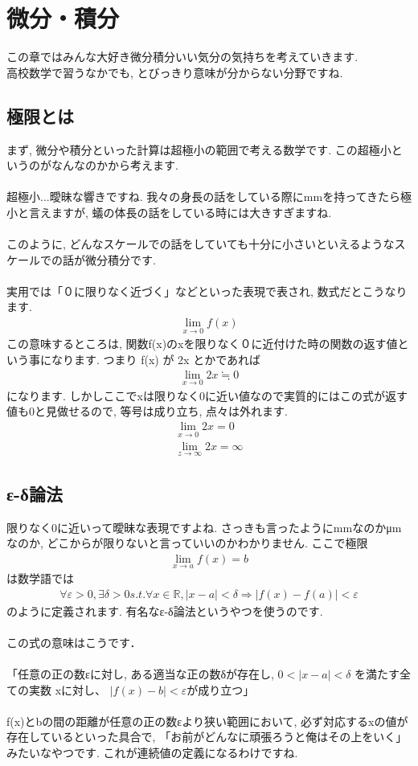 \documentclass[11pt,a4paper]{jreport}
\begin{document}
\section{微分・積分}
この章ではみんな大好き微分積分いい気分の気持ちを考えていきます.\\
高校数学で習うなかでも, とびっきり意味が分からない分野ですね.\\
\subsection{極限とは}
まず, 微分や積分といった計算は超極小の範囲で考える数学です. この超極小というのがなんなのかから考えます.\\
\\
超極小...曖昧な響きですね. 我々の身長の話をしている際にmmを持ってきたら極小と言えますが, 蟻の体長の話をしている時には大きすぎますね. \\
\\
このように, どんなスケールでの話をしていても十分に小さいといえるようなスケールでの話が微分積分です.\\
\\
実用では「０に限りなく近づく」などといった表現で表され, 数式だとこうなります.
\begin{eqnarray}
\lim_{x\to0} f(x)
\end{eqnarray}
この意味するところは, 関数f(x)のxを限りなく０に近付けた時の関数の返す値という事になります. つまり f(x) が 2x とかであれば
\begin{eqnarray}
\lim_{x\to0} 2x ≒ 0
\end{eqnarray}
になります. しかしここでxは限りなく0に近い値なので実質的にはこの式が返す値も0と見做せるので, 等号は成り立ち, 点々は外れます.
\begin{eqnarray}
\lim_{x\to0} 2x = 0\\
\lim_{z\to\infty} 2x = \infty
\end{eqnarray}
\subsection{ε-δ論法 \label{ed}}
限りなく0に近いって曖昧な表現ですよね. さっきも言ったようにmmなのかμmなのか, どこからが限りないと言っていいのかわかりません. ここで極限
\begin{eqnarray}
\lim_{x\to a} f(x) = b
\end{eqnarray}
は数学語では
\begin{eqnarray}
\forall \varepsilon >0, \exists \delta>0  s.t.  \forall x \in \mathbb{R}, |x-a|<\delta \Rightarrow |f(x)-f(a)|<\varepsilon
\label{eq:ed}
\end{eqnarray}
のように定義されます. 有名なε-δ論法というやつを使うのです.\\
\\
この式の意味はこうです．\\
\\
「任意の正の数εに対し, ある適当な正の数δが存在し, $ 0 < |x − a| < δ$ を満たす全ての実数 xに対し、 $|f(x) − b| < ε$が成り立つ」\\
\\
f(x)とbの間の距離が任意の正の数εより狭い範囲において, 必ず対応するxの値が存在しているといった具合で, 「お前がどんなに頑張ろうと俺はその上をいく」みたいなやつです. これが連続値の定義になるわけですね.
\end{document}
